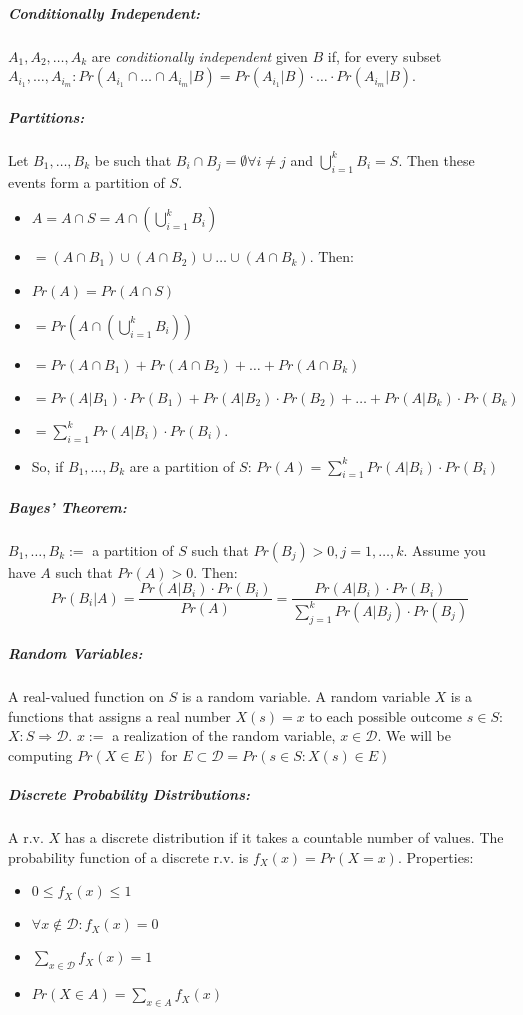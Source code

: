 \documentclass[landscape,10pt]{article}
\begin{document}
\begin{multicols}{3}
    \subparagraph*{Conditionally Independent: } 
        $A_1, A_2, \ldots, A_k$ are \textit{conditionally independent} given $B$ if, for every subset $A_{i_1}, \ldots, A_{i_m}: Pr(A_{i_1} \cap \ldots \cap A_{i_m} | B) = Pr(A_{i_1} | B) \cdot \ldots \cdot Pr(A_{i_m} | B)$.

    \subparagraph*{Partitions: }
        Let $B_1, \ldots, B_k$ be such that $B_i \cap B_j = \emptyset \forall i \neq j$ and $\bigcup_{i = 1}^{k} B_i = S$. Then these events form a partition of $S$.
        \begin{itemize}
            \item[] $A = A \cap S = A \cap \left(\bigcup_{i = 1}^{k} B_i\right) $
            \item[] $= (A \cap B_1) \cup (A \cap B_2) \cup \ldots \cup (A \cap B_k)$. Then: 
            \item[] $Pr(A) = Pr(A \cap S) $
            \item[] $= Pr(A \cap \left(\bigcup_{i = 1}^{k} B_i \right)) $
            \item[] $= Pr(A \cap B_1) + Pr(A \cap B_2) + \ldots + Pr(A \cap B_k)$
            \item[] $=Pr(A|B_1) \cdot Pr(B_1) + Pr(A|B_2)\cdot Pr(B_2) + \ldots + Pr(A|B_k) \cdot Pr(B_k) $
            \item[] $= \sum_{i=1}^{k} Pr(A|B_i)\cdot Pr(B_i)$. 
            \item[]So, if $B_1, \ldots, B_k$ are a partition of $S$: $Pr(A) = \sum_{i=1}^{k}Pr(A|B_i)\cdot Pr(B_i)$
        \end{itemize}

    \subparagraph*{Bayes' Theorem:}
        $B_1, \ldots, B_k :=$ a partition of $S$ such that $Pr(B_j) > 0, j = 1, \ldots, k$. Assume you have $A$ such that $Pr(A) > 0$. Then: $$Pr(B_i|A) = \frac{Pr(A|B_i) \cdot Pr(B_i)}{Pr(A)} = \frac{Pr(A|B_i) \cdot Pr(B_i)}{\sum\limits_{j=1}^{k}Pr(A|B_j) \cdot Pr(B_j)}$$

    \subparagraph*{Random Variables:}
        A real-valued function on $S$ is a  random variable. A random variable $X$ is a functions that assigns a real number $X(s)=x$ to each possible outcome $s \in S$: $X:S \Rightarrow \mathcal{D}$. $x:=$ a realization of the random variable, $x \in \mathcal{D}$. We will be computing $Pr(X \in E)$ for $E \subset \mathcal{D} = Pr(s \in S: X(s) \in E)$
    
    \subparagraph*{Discrete Probability Distributions: }
    A r.v. $X$ has a discrete distribution if it takes a countable number of values. The probability function of a discrete r.v. is $f_X(x) = Pr(X=x)$. Properties:
    \begin{itemize}
        \item[] $0 \leq f_X(x) \leq 1$
        \item[] $\forall x \notin \mathcal{D}: f_X(x) = 0$
        \item[] $\sum\limits_{x \in \mathcal{D}} f_X(x) = 1$
        \item[] $Pr(X \in A) = \sum\limits_{x \in A} f_X (x)$
    \end{itemize}


\end{multicols}
\end{document}
